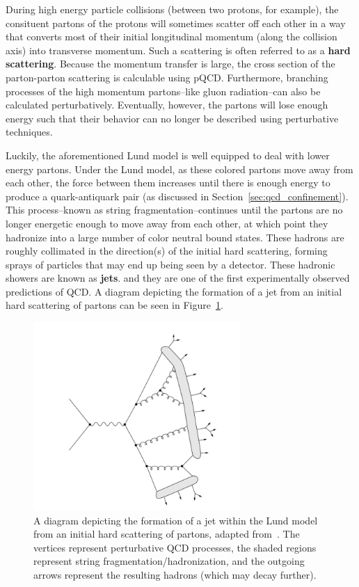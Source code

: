 During high energy particle collisions (between two protons, for example), the consituent partons of the protons will sometimes scatter off each other in a way that converts most of their initial longitudinal momentum (along the collision axis) into transverse momentum. Such a scattering is often referred to as a \textbf{hard scattering}. Because the momentum transfer is large, the cross section of the parton-parton scattering is calculable using pQCD. Furthermore, branching processes of the high momentum partons--like gluon radiation--can also be calculated perturbatively. Eventually, however, the partons will lose enough energy such that their behavior can no longer be described using perturbative techniques.

Luckily, the aforementioned Lund model is well equipped to deal with lower energy partons. Under the Lund model, as these colored partons move away from each other, the force between them increases until there is enough energy to produce a quark-antiquark pair (as discussed in Section~\ref{sec:qcd_confinement}). This process--known as string fragmentation--continues until the partons are no longer energetic enough to move away from each other, at which point they hadronize into a large number of color neutral bound states. These hadrons are roughly collimated in the direction(s) of the initial hard scattering, forming sprays of particles that may end up being seen by a detector. These hadronic showers are known as \textbf{jets}. and they are one of the first experimentally observed predictions of QCD. A diagram depicting the formation of a jet from an initial hard scattering of partons can be seen in Figure~\ref{fig:jet_diagram}. 

\begin{figure}[ht]
    \centering
    \includegraphics[width=0.7\textwidth]{figures/introduction/jet_string.png}
    \caption{A diagram depicting the formation of a jet within the Lund model from an initial hard scattering of partons, adapted from~\cite{JetStringDiagram}. The vertices represent perturbative QCD processes, the shaded regions represent string fragmentation/hadronization, and the outgoing arrows represent the resulting hadrons (which may decay further).}
    \label{fig:jet_diagram}
\end{figure}

